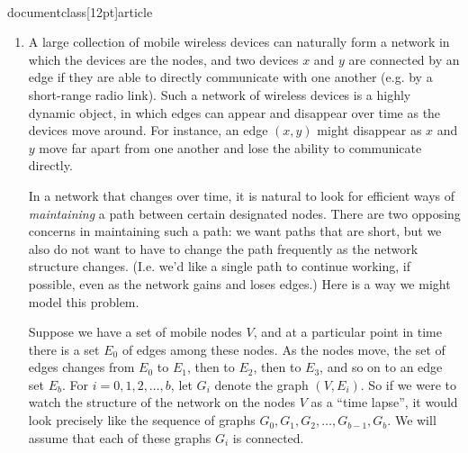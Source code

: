 \\documentclass[12pt]{article}
\begin{document}
\begin{enumerate}



\item

A large collection of mobile wireless devices 
can naturally form a network 
in which the devices are the nodes, and two  
devices $x$ and $y$ are connected by an edge 
if they are able to directly communicate with 
one another (e.g. by a short-range radio link). 
Such a network of wireless devices 
is a highly dynamic object, in which edges 
can appear and disappear over time as the devices move around.   
For instance, an edge $(x,y)$ might disappear as $x$ and $y$ 
move far apart from one another and lose  
the ability to communicate directly. 
 
In a network that changes over time, it is natural 
to look for efficient ways of {\em maintaining} 
a path between certain designated nodes. 
There are two opposing concerns in maintaining such a path: 
we want paths that are short, but we also do not 
want to have to change the path frequently  
as the network structure changes. 
(I.e. we'd like a single path to continue working, if possible, 
even as the network gains and loses edges.) 
Here is a way we might model this problem. 
 
Suppose we have a set of mobile nodes $V$, 
and at a particular point in time there is a set 
$E_0$ of edges among these nodes. 
As the nodes move, the set of edges changes 
from $E_0$ to $E_1$, then to $E_2$, then to $E_3$, 
and so on to an edge set $E_b$. 
For $i = 0, 1, 2, \ldots, b$,  
let $G_i$ denote the graph $(V,E_i)$. 
So if we were to watch the structure of the network 
on the nodes $V$ as a ``time lapse'', it would look precisely 
like the sequence of graphs $G_0, G_1, G_2, \ldots, G_{b-1}, G_b$. 
We will assume that each of these graphs $G_i$ is connected. 
 

\end{enumerate}
\end{document}
